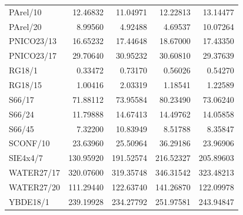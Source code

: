\documentclass[10pt,a4paper]{article}
\begin{document}
{\begin{longtable}{@{}lrrrr@{}}
PArel/10 & 12.46832 & 11.04971 & 12.22813 & 13.14477 \\
PArel/20 & 8.99560 & 4.92488 & 4.69537 & 10.07264 \\
PNICO23/13 & 16.65232 & 17.44648 & 18.67000 & 17.43350 \\
PNICO23/17 & 29.70640 & 30.95232 & 30.60810 & 29.37639 \\
RG18/1 & 0.33472 & 0.73170 & 0.56026 & 0.54270 \\
RG18/15 & 1.00416 & 2.03319 & 1.18541 & 1.22589 \\
S66/17 & 71.88112 & 73.95584 & 80.23490 & 73.06240 \\
S66/24 & 11.79888 & 14.67413 & 14.49762 & 14.05858 \\
S66/45 & 7.32200 & 10.83949 & 8.51788 & 8.35847 \\
SCONF/10 & 23.63960 & 25.50964 & 36.29186 & 23.96906 \\
SIE4x4/7 & 130.95920 & 191.52574 & 216.52327 & 205.89603 \\
WATER27/17 & 320.07600 & 319.35748 & 346.31542 & 323.48213 \\
WATER27/20 & 111.29440 & 122.63740 & 141.26870 & 122.09978 \\
YBDE18/1 & 239.19928 & 234.27792 & 251.97581 & 243.94847 \\
\bottomrule
\end{longtable}
}
\end{document}
